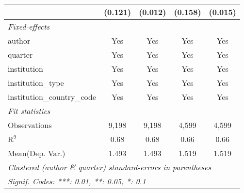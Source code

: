 \begin{tabular}{lcccc}
                                            & (0.121) & (0.012)     & (0.158) & (0.015)\\   
   \midrule
   \emph{Fixed-effects}\\
   author                                   & Yes     & Yes         & Yes     & Yes\\  
   quarter                                  & Yes     & Yes         & Yes     & Yes\\  
   institution                              & Yes     & Yes         & Yes     & Yes\\  
   institution\_type                        & Yes     & Yes         & Yes     & Yes\\  
   institution\_country\_code               & Yes     & Yes         & Yes     & Yes\\  
   \midrule
   \emph{Fit statistics}\\
   Observations                             & 9,198   & 9,198       & 4,599   & 4,599\\  
   R$^2$                                    & 0.68    & 0.68        & 0.66    & 0.66\\  
Mean(Dep. Var.) & 1.493 & 1.493 & 1.519 & 1.519 \\
   \midrule \midrule
   \multicolumn{5}{l}{\emph{Clustered (author \& quarter) standard-errors in parentheses}}\\
   \multicolumn{5}{l}{\emph{Signif. Codes: ***: 0.01, **: 0.05, *: 0.1}}\\
\end{tabular}
\par\endgroup
